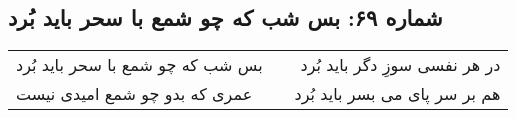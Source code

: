 \begin{center}
\section*{شماره ۶۹: بس شب که چو شمع با سحر باید بُرد}
\label{sec:069}
\begin{longtable}{l p{0.5cm} r}
بس شب که چو شمع با سحر باید بُرد
&&
در هر نفسی سوزِ دگر باید بُرد
\\
عمری که بدو چو شمع امیدی نیست
&&
هم بر سر پای می بسر باید بُرد
\\
\end{longtable}
\end{center}
